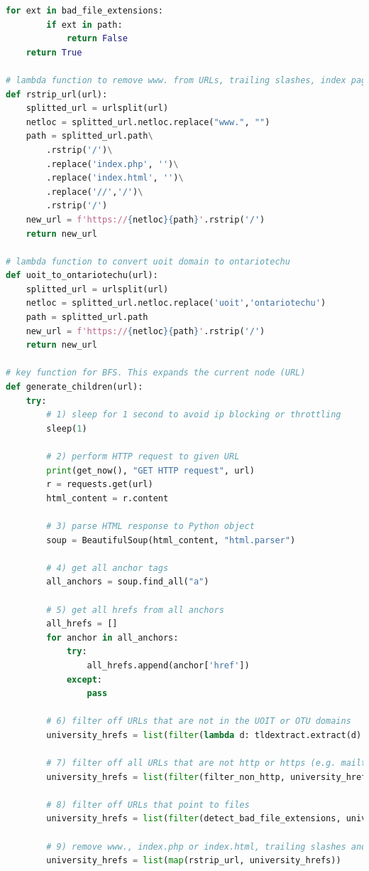 \begin{lstlisting}[language=Python]
    for ext in bad_file_extensions:
        if ext in path:
            return False
    return True

# lambda function to remove www. from URLs, trailing slashes, index pages and double slashes.
def rstrip_url(url):
    splitted_url = urlsplit(url)
    netloc = splitted_url.netloc.replace("www.", "")
    path = splitted_url.path\
        .rstrip('/')\
        .replace('index.php', '')\
        .replace('index.html', '')\
        .replace('//','/')\
        .rstrip('/')
    new_url = f'https://{netloc}{path}'.rstrip('/')
    return new_url

# lambda function to convert uoit domain to ontariotechu
def uoit_to_ontariotechu(url):
    splitted_url = urlsplit(url)
    netloc = splitted_url.netloc.replace('uoit','ontariotechu')
    path = splitted_url.path
    new_url = f'https://{netloc}{path}'.rstrip('/')
    return new_url

# key function for BFS. This expands the current node (URL)
def generate_children(url):
    try:
        # 1) sleep for 1 second to avoid ip blocking or throttling
        sleep(1)
        
        # 2) perform HTTP request to given URL
        print(get_now(), "GET HTTP request", url)
        r = requests.get(url)
        html_content = r.content

        # 3) parse HTML response to Python object
        soup = BeautifulSoup(html_content, "html.parser")

        # 4) get all anchor tags
        all_anchors = soup.find_all("a")
        
        # 5) get all hrefs from all anchors
        all_hrefs = []
        for anchor in all_anchors:
            try:
                all_hrefs.append(anchor['href'])
            except:
                pass

        # 6) filter off URLs that are not in the UOIT or OTU domains
        university_hrefs = list(filter(lambda d: tldextract.extract(d).domain in university_domains, all_hrefs))

        # 7) filter off all URLs that are not http or https (e.g. mailto)
        university_hrefs = list(filter(filter_non_http, university_hrefs))

        # 8) filter off URLs that point to files
        university_hrefs = list(filter(detect_bad_file_extensions, university_hrefs))

        # 9) remove www., index.php or index.html, trailing slashes and double slashes
        university_hrefs = list(map(rstrip_url, university_hrefs))


\end{lstlisting}
